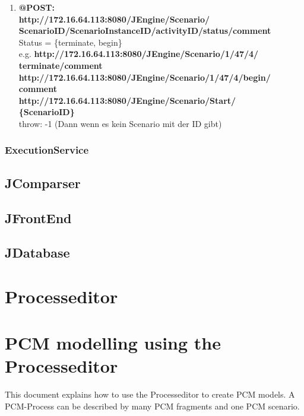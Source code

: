 \documentclass{acm_proc_article-sp}
\begin{document}
\begin{enumerate}
\item \textbf{@POST:}\\


\textbf{http://172.16.64.113:8080/JEngine/Scenario/\\ScenarioID/ScenarioInstanceID/activityID/status/comment}\\
Status = \{terminate, begin\}\\
e.g. \textbf{http://172.16.64.113:8080/JEngine/Scenario/1/47/4/\\terminate/comment}\\
\textbf{http://172.16.64.113:8080/JEngine/Scenario/1/47/4/begin/\\comment}\\
\textbf{http://172.16.64.113:8080/JEngine/Scenario/Start/\\\{ScenarioID\}}\\
throw: -1 (Dann wenn es kein Scenario mit der ID gibt)\\
%
%
\end{enumerate}
\subsubsection{ExecutionService}

%
%
\subsection{JComparser}

%
%
\subsection{JFrontEnd}

%
%
\subsection{JDatabase}

%
%
\section{Processeditor}

%
%
\section{PCM modelling using the Processeditor}\label{pcm-modelling-using-the-processeditor}
This document explains how to use the Processeditor to create PCM
models. A PCM-Process can be described by many PCM fragments and one PCM
scenario.
\end{document}
